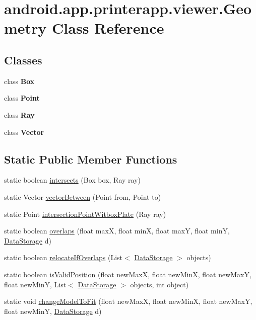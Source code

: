 \hypertarget{classandroid_1_1app_1_1printerapp_1_1viewer_1_1_geometry}{}\section{android.\+app.\+printerapp.\+viewer.\+Geometry Class Reference}
\label{classandroid_1_1app_1_1printerapp_1_1viewer_1_1_geometry}
\subsection*{Classes}
\begin{DoxyCompactItemize}
\item 
class {\bfseries Box}
\item 
class {\bfseries Point}
\item 
class {\bfseries Ray}
\item 
class {\bfseries Vector}
\end{DoxyCompactItemize}
\subsection*{Static Public Member Functions}
\begin{DoxyCompactItemize}
\item 
static boolean \hyperlink{classandroid_1_1app_1_1printerapp_1_1viewer_1_1_geometry_a22b7d2c79b772f3b2a31b2a2769caff3}{intersects} (Box box, Ray ray)
\item 
static Vector \hyperlink{classandroid_1_1app_1_1printerapp_1_1viewer_1_1_geometry_ab016cd77ad8db00642e7cff95d60a779}{vector\+Between} (Point from, Point to)
\item 
static Point \hyperlink{classandroid_1_1app_1_1printerapp_1_1viewer_1_1_geometry_a3827ef80605c58d7383124c5a0d04dbe}{intersection\+Point\+Witbox\+Plate} (Ray ray)
\item 
static boolean \hyperlink{classandroid_1_1app_1_1printerapp_1_1viewer_1_1_geometry_a9c12465b13faef1cc584c574a7450913}{overlaps} (float maxX, float minX, float maxY, float minY, \hyperlink{classandroid_1_1app_1_1printerapp_1_1viewer_1_1_data_storage}{Data\+Storage} d)
\item 
static boolean \hyperlink{classandroid_1_1app_1_1printerapp_1_1viewer_1_1_geometry_ab2c7eda77052eb4ace97fb72b14379c9}{relocate\+If\+Overlaps} (List$<$ \hyperlink{classandroid_1_1app_1_1printerapp_1_1viewer_1_1_data_storage}{Data\+Storage} $>$ objects)
\item 
static boolean \hyperlink{classandroid_1_1app_1_1printerapp_1_1viewer_1_1_geometry_a8465ccc737d89aaabfa00bcf9d2c95c3}{is\+Valid\+Position} (float new\+MaxX, float new\+MinX, float new\+MaxY, float new\+MinY, List$<$ \hyperlink{classandroid_1_1app_1_1printerapp_1_1viewer_1_1_data_storage}{Data\+Storage} $>$ objects, int object)
\item 
static void \hyperlink{classandroid_1_1app_1_1printerapp_1_1viewer_1_1_geometry_a539751338e38d7235cceaa9a4aceebf6}{change\+Model\+To\+Fit} (float new\+MaxX, float new\+MinX, float new\+MaxY, float new\+MinY, \hyperlink{classandroid_1_1app_1_1printerapp_1_1viewer_1_1_data_storage}{Data\+Storage} d)
\end{DoxyCompactItemize}


